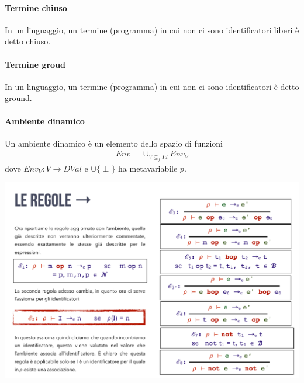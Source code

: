 \documentclass[a4paper, 10pt]{report}
\begin{document}
\paragraph*{Termine chiuso} In un linguaggio, un termine (programma) in cui non ci sono identificatori liberi è detto chiuso.

\paragraph*{Termine groud} In un linguaggio, un termine (programma) in cui non ci sono identificatori è detto ground.

\paragraph*{Ambiente dinamico} Un ambiente dinamico è un elemento dello spazio di funzioni
\begin{align*}
Env = \cup_{V \subseteq_f Id} Env_V
\end{align*}
dove $Env_V : V \rightarrow DVal$ e $\cup\{\perp\}$ ha metavariabile $p$.

\begin{center}
\includegraphics[scale=0.8]{regole.pdf}
\end{center}
\end{document}
